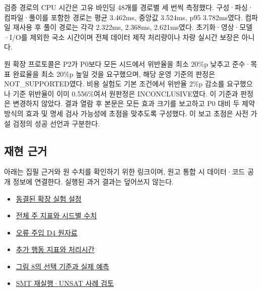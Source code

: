 \documentclass[11pt,a4paper]{article}
\begin{document}
검증 경로의 CPU 시간은 고유 바인딩 48개를 경로별 세 번씩 측정했다. 구성·파싱·컴파일·풀이를 포함한 경로는 평균 3.462ms, 중앙값 3.524ms, p95 3.782ms였다. 컴파일 재사용 후 풀이 경로는 각각 2.322ms, 2.368ms, 2.621ms였다. 초기화·영상·모델·I/O를 제외한 국소 시간이며 전체 데이터 제작 처리량이나 차량 실시간 보장은 아니다.\par

원 확장 프로토콜은 P2가 P0보다 모든 시드에서 위반율을 최소 20\%p 낮추고 준수·목표 완료율을 최소 20\%p 높일 것을 요구했으며, 해당 운영 기준의 판정은 NOT\_SUPPORTED였다. 비용 실험도 기본 조건에서 위반율 2\%p 감소를 요구했으나 기준 위반율이 이미 0.556\%여서 원판정은 INCONCLUSIVE였다. 이 기준과 판정은 변경하지 않았다. 결과 열람 후 본문은 모든 효과 크기를 보고하고 P0 대비 두 제약 방식의 효과 및 명세 검사 가능성에 초점을 맞추도록 구성했다. 이 보고 초점은 사전 가설 검정의 성공 선언과 구분한다.\par

\begingroup\small\setlength{\parskip}{3pt}
\subsection*{재현 근거}

아래는 집필 근거와 원 수치를 확인하기 위한 링크이며, 원고 통합 시 데이터·코드 공개 정보에 연결한다. 실행된 과거 결과는 덮어쓰지 않는다.\par

\begin{itemize}\setlength{\itemsep}{0pt}\setlength{\parsep}{0pt}\setlength{\topsep}{2pt}
\item \href{\detokenize{../temporal-expansion-protocol-2026-09-29-001/protocol.json}}{동결된 확장 실험 설정}
\item \href{\detokenize{../temporal-experiment-closure-2026-09-29-001/all_primary_metrics.csv}}{전체 주 지표와 시드별 수치}
\item \href{\detokenize{../../paper1-temporal-diversity-001/diversity-analysis-2026-09-29-001/RESULT.json}}{오류 주입 D4 원자료}
\item \href{\detokenize{../temporal-secondary-metrics-2026-09-29-001/RESULT.json}}{추가 행동 지표와 처리시간}
\item \href{\detokenize{../experiments-section-2026-09-30-002/selected_cases.json}}{그림 8의 선택 기준과 실제 예측}
\end{itemize}

\begin{itemize}\setlength{\itemsep}{0pt}\setlength{\parsep}{0pt}\setlength{\topsep}{2pt}
\item \href{\detokenize{../experiments-section-2026-09-30-002/unsat_review.json}}{SMT 재실행·UNSAT 사례 검토}
\end{itemize}
\end{document}
